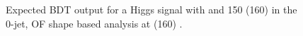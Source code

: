 \begin{figure}[!hbtp]
\centering
{}
\centering
{}
\caption{Expected BDT output for a Higgs signal with  and 150 (160) \GeVcc in the 0-jet, OF shape based analysis at   (160) \GeVcc.}
\label{fig:bdt_mh125}
\end{figure}
